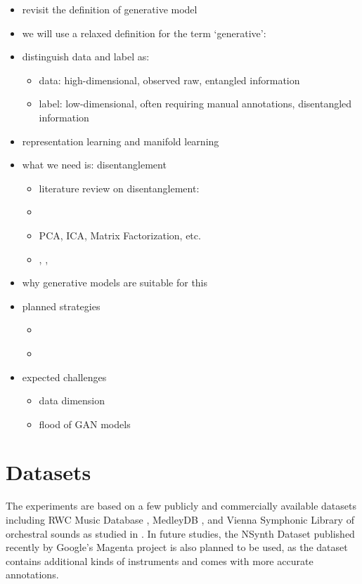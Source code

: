 
\begin{itemize}
	\item revisit the definition of generative model
	\item we will use a relaxed definition for the term `generative':
	\item distinguish data and label as:
	\begin{itemize}
		\item data: high-dimensional, observed raw, entangled information
		\item label: low-dimensional, often requiring manual annotations, disentangled information
	\end{itemize}
	\item representation learning and manifold learning
	\item what we need is: disentanglement
	\begin{itemize}
		\item literature review on disentanglement:
		\item \cite{brahma2016disentanglement}
		\item PCA, ICA, Matrix Factorization, etc.
		\item \cite{chen2016infogan}, \cite{achille2018information}, \cite{donahue2017gan}
	\end{itemize}
	\item why generative models are suitable for this
	\item planned strategies
	\begin{itemize}
		\item \cite{ganin2015domain}
		\item \cite{donahue2017gan}
	\end{itemize}
	\item expected challenges
	\begin{itemize}
		\item data dimension
		\item flood of GAN models
	\end{itemize}
\end{itemize}
\section{Datasets}

The experiments are based on a few publicly and commercially available datasets including RWC Music Database \cite{goto2003rwc}, MedleyDB \cite{bittner2014medleydb}, and Vienna Symphonic Library of orchestral sounds as studied in \cite{humphrey2011nlse}.
In future studies, the NSynth Dataset published recently by Google's Magenta project \cite{engel2017nsynth} is also planned to be used, as the dataset contains additional kinds of instruments and comes with more accurate annotations.

